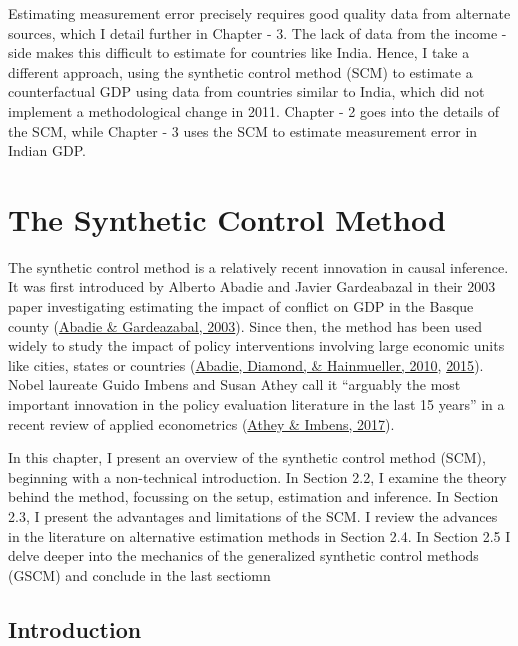 \documentclass[12pt,nobind, a4paper]{reedthesis}
\begin{document}
 Estimating measurement error precisely requires good quality data from alternate sources, which I detail further in Chapter - 3. The lack of data from the income - side makes this difficult to estimate for countries like India. Hence, I take a different approach, using the synthetic control method (SCM) to estimate a counterfactual GDP using data from countries similar to India, which did not implement a methodological change in 2011. Chapter - 2 goes into the details of the SCM, while Chapter - 3 uses the SCM to estimate measurement error in Indian GDP.

 \hypertarget{the-synthetic-control-method}{%
 \chapter{The Synthetic Control Method}\label{the-synthetic-control-method}}

 The synthetic control method is a relatively recent innovation in causal inference. It was first introduced by Alberto Abadie and Javier Gardeabazal in their 2003 paper investigating estimating the impact of conflict on GDP in the Basque county (\protect\hyperlink{ref-abadie_economic_2003}{Abadie \& Gardeazabal, 2003}). Since then, the method has been used widely to study the impact of policy interventions involving large economic units like cities, states or countries (\protect\hyperlink{ref-abadie_synthetic_2010}{Abadie, Diamond, \& Hainmueller, 2010}, \protect\hyperlink{ref-abadie_comparative_2015}{2015}). Nobel laureate Guido Imbens and Susan Athey call it ``arguably the most important innovation in the policy evaluation literature in the last 15 years'' in a recent review of applied econometrics (\protect\hyperlink{ref-athey_state_2017}{Athey \& Imbens, 2017}).
 \linebreak

 In this chapter, I present an overview of the synthetic control method (SCM), beginning with a non-technical introduction. In Section 2.2, I examine the theory behind the method, focussing on the setup, estimation and inference. In Section 2.3, I present the advantages and limitations of the SCM. I review the advances in the literature on alternative estimation methods in Section 2.4. In Section 2.5 I delve deeper into the mechanics of the generalized synthetic control methods (GSCM) and conclude in the last sectiomn

 \hypertarget{introduction}{%
 \section{Introduction}\label{introduction}}
\end{document}
